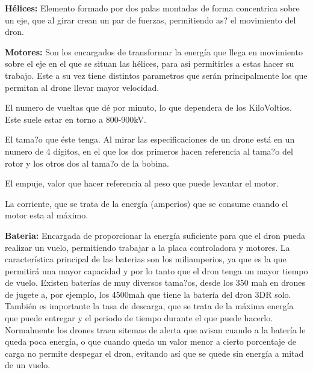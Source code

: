 \hspace{1 cm}\textbf{H\'elices:} Elemento formado por dos palas montadas de forma concentrica sobre un eje, que al girar crean un par de fuerzas, permitiendo as? el movimiento del dron.

\hspace{1 cm}\textbf{Motores:} Son los encargados de transformar la energ\'ia que llega en movimiento sobre el eje en el que se situan las h\'elices, para asi permitirles a estas hacer su trabajo. Este a su vez tiene distintos parametros que ser\'an principalmente los que permitan al drone llevar mayor velocidad. 

\hspace{1 cm} El numero de vueltas que d\'e por minuto, lo que dependera de los KiloVoltios. Este suele estar en torno a 800-900kV.

\hspace{1 cm} El tama?o que \'este tenga. Al mirar las especificaciones de un drone est\'a en un numero de 4 d\'igitos, en el que los dos primeros hacen referencia al tama?o del rotor y los otros dos al tama?o de la bobina. 

\hspace{1 cm} El empuje, valor que hacer referencia al peso que puede levantar el motor.

\hspace{1 cm} La corriente, que se trata de la energ\'ia (amperios) que se consume cuando el motor esta al m\'aximo.


\hspace{1 cm}\textbf{Bateria:} Encargada de proporcionar la energ\'ia suficiente para que el dron pueda realizar un vuelo, permitiendo trabajar a la placa controladora y motores. La caracter\'istica principal de las baterias son los miliamperios, ya que es la que permitir\'a una mayor capacidad y por lo tanto que el dron tenga un mayor tiempo de vuelo. Existen bater\'ias de muy diversos tama?os, desde los 350 mah en drones de jugete a, por ejemplo, los 4500mah que tiene la bater\'ia del dron 3DR solo. Tambi\'en es importante la tasa de descarga, que se trata de la m\'axima energ\'ia que puede entregar y el periodo de tiempo durante el que puede hacerlo. Normalmente los drones traen sitemas de alerta que avisan cuando a la bater\'ia le queda poca energ\'ia, o que cuando queda un valor menor a cierto porcentaje de carga no permite despegar el dron, evitando as\'i que se quede sin energ\'ia a mitad de un vuelo.


